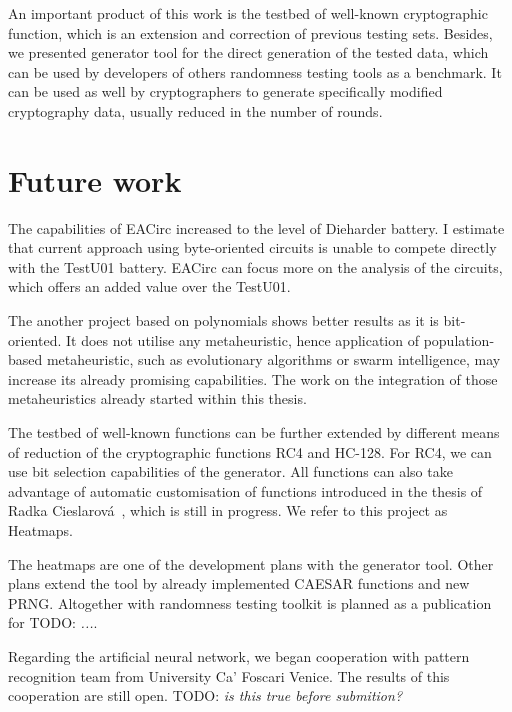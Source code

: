\documentclass[
  print, %
  Table,   %
  nolof,     %
  nolot,     %
  11pt, %
  oneside  %
]{fithesis3}
\newcommand{\todo}[1]{TODO: \textit{#1}}
\begin{document}
An important product of this work is the testbed of well-known cryptographic function, which is an extension and correction of previous testing sets. Besides, we presented generator tool for the direct generation of the tested data, which can be used by developers of others randomness testing tools as a benchmark. It can be used as well by cryptographers to generate specifically modified cryptography data, usually reduced in the number of rounds.

\section{Future work}
\label{sec:conclusion-future}

The capabilities of EACirc increased to the level of Dieharder battery. I estimate that current approach using byte-oriented circuits is unable to compete directly with the TestU01 battery. EACirc can focus more on the analysis of the circuits, which offers an added value over the TestU01.

The another project based on polynomials shows better results as it is bit-oriented. It does not utilise any metaheuristic, hence application of population-based metaheuristic, such as evolutionary algorithms or swarm intelligence, may increase its already promising capabilities. The work on the integration of those metaheuristics already started within this thesis.

The testbed of well-known functions can be further extended by different means of reduction of the cryptographic functions RC4 and HC-128. For RC4, we can use bit selection capabilities of the generator. All functions can also take advantage of automatic customisation of functions introduced in the thesis of Radka Cieslarová~\cite{cieslarovaBcThesis}, which is still in progress. We refer to this project as Heatmaps.

The heatmaps are one of the development plans with the generator tool. Other plans extend the tool by already implemented CAESAR functions and new PRNG. Altogether with randomness testing toolkit is planned as a publication for \todo{...}.

Regarding the artificial neural network, we began cooperation with pattern recognition team from University Ca’ Foscari Venice. The results of this cooperation are still open. \todo{is this true before submition?}

\end{document}
